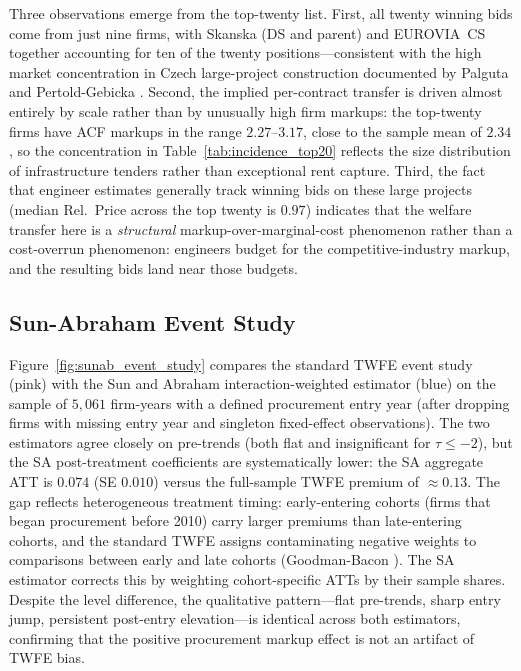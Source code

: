 \documentclass[11pt]{article}
\begin{document}


Three observations emerge from the top-twenty list. First, all twenty winning bids come from just nine firms, with Skanska (DS and parent) and EUROVIA~CS together accounting for ten of the twenty positions---consistent with the high market concentration in Czech large-project construction documented by Palguta and Pertold-Gebicka \cite{PalgutaPertold2017}. Second, the implied per-contract transfer is driven almost entirely by scale rather than by unusually high firm markups: the top-twenty firms have ACF markups in the range $2.27$--$3.17$, close to the sample mean of $2.34$, so the concentration in Table~\ref{tab:incidence_top20} reflects the size distribution of infrastructure tenders rather than exceptional rent capture. Third, the fact that engineer estimates generally track winning bids on these large projects (median Rel.\ Price across the top twenty is $0.97$) indicates that the welfare transfer here is a \emph{structural} markup-over-marginal-cost phenomenon rather than a cost-overrun phenomenon: engineers budget for the competitive-industry markup, and the resulting bids land near those budgets.

\subsection{Sun-Abraham Event Study}\label{app:sunab}

Figure~\ref{fig:sunab_event_study} compares the standard TWFE event study (pink) with the Sun and Abraham \cite{SunAbraham2021} interaction-weighted estimator (blue) on the sample of $5{,}061$ firm-years with a defined procurement entry year (after dropping firms with missing entry year and singleton fixed-effect observations). The two estimators agree closely on pre-trends (both flat and insignificant for $\tau \leq -2$), but the SA post-treatment coefficients are systematically lower: the SA aggregate ATT is $0.074$ (SE $0.010$) versus the full-sample TWFE premium of $\approx 0.13$. The gap reflects heterogeneous treatment timing: early-entering cohorts (firms that began procurement before 2010) carry larger premiums than late-entering cohorts, and the standard TWFE assigns contaminating negative weights to comparisons between early and late cohorts (Goodman-Bacon \cite{GoodmanBacon2021}). The SA estimator corrects this by weighting cohort-specific ATTs by their sample shares. Despite the level difference, the qualitative pattern---flat pre-trends, sharp entry jump, persistent post-entry elevation---is identical across both estimators, confirming that the positive procurement markup effect is not an artifact of TWFE bias.
\end{document}
